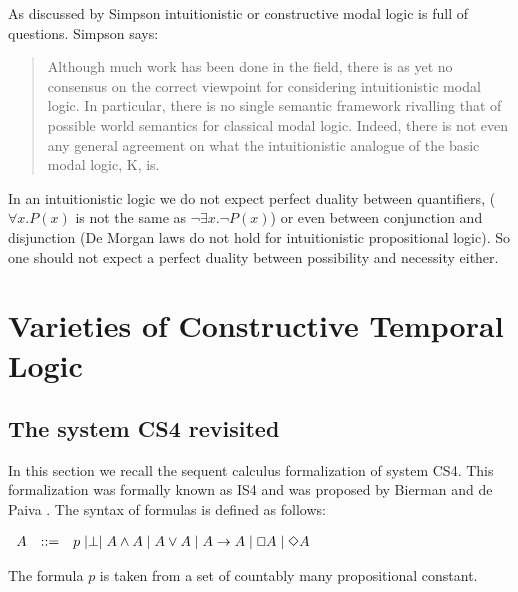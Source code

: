 \documentclass{article}
\renewcommand{\Box}{\oblong}
\begin{document}
As discussed by Simpson intuitionistic or constructive modal logic is
full of questions. Simpson says:
\begin{quote}
Although much work has been done in the field, there is as yet no
consensus on the correct viewpoint for considering intuitionistic
modal logic.  In particular, there is no single semantic framework
rivalling that of possible world semantics for classical modal logic.
Indeed, there is not even any general agreement on what the
intuitionistic analogue of the basic modal logic, K, is.
\end{quote}
In an intuitionistic logic we do not expect perfect duality between
quantifiers, ($\forall x.P(x)$ is not the same as $\neg \exists x.\neg
P(x)$) or even between conjunction and disjunction (De Morgan laws do
not hold for intuitionistic propositional logic). So one should not
expect a perfect duality between possibility and necessity either.

\section{Varieties of Constructive Temporal Logic}

\subsection{The  system CS4 revisited} 

In this section we recall the sequent calculus formalization of system
CS4.  This formalization was formally known as IS4 and was proposed by
Bierman and de Paiva \cite{CS4}.  The syntax of formulas is defined as
follows:
\begin{center}
    \begin{math}
        \begin{array}{lllllllll}
            A & ::= & p \mid \perp \mid A \land A \mid A \lor A \mid A \to A \mid \Box A \mid \Diamond A
        \end{array}
    \end{math}
\end{center}
The formula $p$ is taken from a set of countably many propositional
constant.
\end{document}
